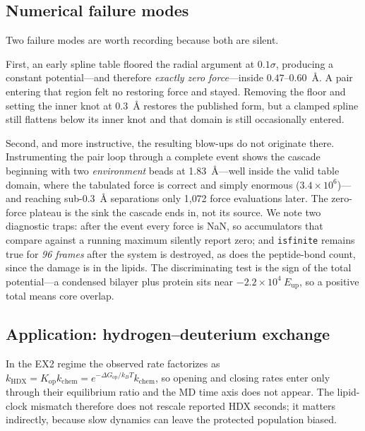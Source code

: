\documentclass[journal=jctcce,manuscript=article,layout=twocolumn]{achemso}
\begin{document}
\subsection{Numerical failure modes}
\label{sec:numerics}

Two failure modes are worth recording because both are silent.

First, an early spline table floored the radial argument at $0.1\sigma$, producing a
constant potential---and therefore \emph{exactly zero force}---inside
$0.47$--$0.60$~\AA. A pair entering that region felt no restoring force and stayed.
Removing the floor and setting the inner knot at $0.3$~\AA{} restores the published
form, but a clamped spline still flattens below its inner knot and that domain is
still occasionally entered.

Second, and more instructive, the resulting blow-ups do not originate there.
Instrumenting the pair loop through a complete event shows the cascade beginning with
two \emph{environment} beads at 1.83~\AA---well inside the valid table domain, where
the tabulated force is correct and simply enormous ($3.4\times10^{6}$)---and reaching
sub-0.3~\AA{} separations only 1{,}072 force evaluations later. The zero-force
plateau is the sink the cascade ends in, not its source. We note two diagnostic
traps: after the event every force is NaN, so accumulators that compare against a
running maximum silently report zero; and \texttt{isfinite} remains true for
\emph{96 frames} after the system is destroyed, as does the peptide-bond count, since
the damage is in the lipids. The discriminating test is the sign of the total
potential---a condensed bilayer plus protein sits near $-2.2\times10^{4}~E_\mathrm{up}$,
so a positive total means core overlap.

\subsection{Application: hydrogen--deuterium exchange}
\label{sec:hdx}

In the EX2 regime the observed rate factorizes as
$k_\mathrm{HDX}=K_\mathrm{op}k_\mathrm{chem}
=e^{-\Delta G_\mathrm{op}/k_BT}k_\mathrm{chem}$, so opening and closing rates enter
only through their equilibrium ratio and the MD time axis does not appear. The
lipid-clock mismatch therefore does not rescale reported HDX seconds; it matters
indirectly, because slow dynamics can leave the protected population biased.
\end{document}

